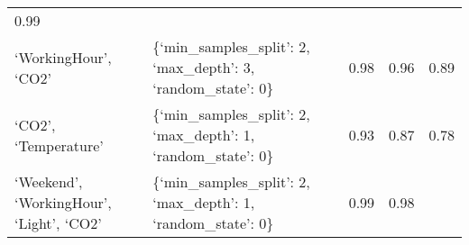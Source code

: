 \documentclass[11pt]{article}
\begin{document}
\begin{longtable}[]{@{}lllll@{}}
\begin{minipage}[t]{0.05\columnwidth}
0.99\strut
\end{minipage}\tabularnewline
\begin{minipage}[t]{0.29\columnwidth}\raggedright
`WorkingHour', `CO2'\strut
\end{minipage} & \begin{minipage}[t]{0.41\columnwidth}\raggedright
\{`min\_samples\_split': 2, `max\_depth': 3, `random\_state': 0\}\strut
\end{minipage} & \begin{minipage}[t]{0.05\columnwidth}\raggedright
0.98\strut
\end{minipage} & \begin{minipage}[t]{0.05\columnwidth}\raggedright
0.96\strut
\end{minipage} & \begin{minipage}[t]{0.05\columnwidth}\raggedright
0.89\strut
\end{minipage}\tabularnewline
\begin{minipage}[t]{0.29\columnwidth}\raggedright
`CO2', `Temperature'\strut
\end{minipage} & \begin{minipage}[t]{0.41\columnwidth}\raggedright
\{`min\_samples\_split': 2, `max\_depth': 1, `random\_state': 0\}\strut
\end{minipage} & \begin{minipage}[t]{0.05\columnwidth}\raggedright
0.93\strut
\end{minipage} & \begin{minipage}[t]{0.05\columnwidth}\raggedright
0.87\strut
\end{minipage} & \begin{minipage}[t]{0.05\columnwidth}\raggedright
0.78\strut
\end{minipage}\tabularnewline
\begin{minipage}[t]{0.29\columnwidth}\raggedright
`Weekend', `WorkingHour', `Light', `CO2'\strut
\end{minipage} & \begin{minipage}[t]{0.41\columnwidth}\raggedright
\{`min\_samples\_split': 2, `max\_depth': 1, `random\_state': 0\}\strut
\end{minipage} & \begin{minipage}[t]{0.05\columnwidth}\raggedright
0.99\strut
\end{minipage} & \begin{minipage}[t]{0.05\columnwidth}\raggedright
0.98\strut
\end{minipage} & \begin{minipage}[t]{0.05\columnwidth}\raggedright

\end{minipage}
\end{longtable}
\end{document}
